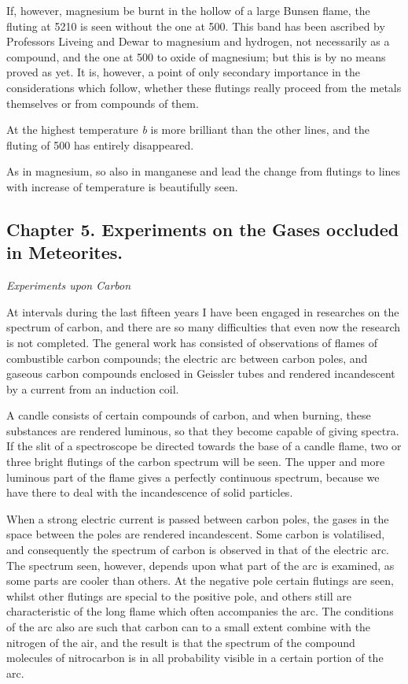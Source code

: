 \documentclass[a4paper, 12pt, oneside, polutonikogreek, english]{article}
\begin{document}
If, however, magnesium be burnt in the hollow of a large Bunsen flame, the fluting at 5210 is seen without the one at 500. This band has been ascribed by Professors Liveing and Dewar to magnesium and hydrogen, not necessarily as a compound, and the one at 500 to oxide of magnesium; but this is by no means proved as yet. It is, however, a point of only secondary importance in the considerations which follow, whether these flutings really proceed from the metals themselves or from compounds of them.

At the highest temperature \emph{b} is more brilliant than the other lines, and the fluting of 500 has entirely disappeared.

As in magnesium, so also in manganese and lead the change from flutings to lines with increase of temperature is beautifully seen.

\subsection{Chapter 5. Experiments on the Gases occluded in Meteorites.}

\emph{Experiments upon Carbon}

At intervals during the last fifteen years I have been engaged in researches on the spectrum of carbon, and there are so many difficulties that even now the research is not completed. The general work has consisted of observations of flames of combustible carbon compounds; the electric arc between carbon poles, and gaseous carbon compounds enclosed in Geissler tubes and rendered incandescent by a current from an induction coil.

A candle consists of certain compounds of carbon, and when burning, these substances are rendered luminous, so that they become capable of giving spectra. If the slit of a spectroscope be directed towards the base of a candle flame, two or three bright flutings of the carbon spectrum will be seen. The upper and more luminous part of the flame gives a perfectly continuous spectrum, because we have there to deal with the incandescence of solid particles.

When a strong electric current is passed between carbon poles, the gases in the space between the poles are rendered incandescent. Some carbon is volatilised, and consequently the spectrum of carbon is observed in that of the electric arc. The spectrum seen, however, depends upon what part of the arc is examined, as some parts are cooler than others. At the negative pole certain flutings are seen, whilst other flutings are special to the positive pole, and others still are characteristic of the long flame which often accompanies the arc. The conditions of the arc also are such that carbon can to a small extent combine with the nitrogen of the air, and the result is that the spectrum of the compound molecules of nitrocarbon is in all probability visible in a certain portion of the arc.
\end{document}

